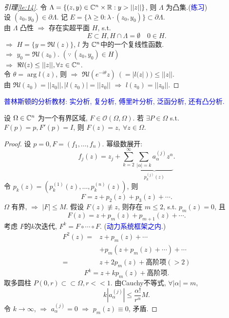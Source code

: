 \begin{proof}[引理\ref{le:14}]
  令 $\Lambda  =\{(z,y)\in {\mathbb C}^n \times {\mathbb R}: y >||z|| \}$, 则 $\Lambda  $ 为凸集.(\textcolor{blue}{练习}) \\
  设 $(z_0,y_0) \in \partial \Lambda  $. 记 $E=\{\lambda \geq 0: \lambda \cdot (z_0,y_0)\} \subset \partial \Lambda  $.\\
  由 $\Lambda  $  凸性  $\Rightarrow $ 存在实超平面 $H$, s.t. 
  $$ E \subset H, H \cap \Lambda =\emptyset  \quad 0 \in H. $$ 
  $\Rightarrow $ $H=\{y=\Re l(z)\}$, $l$  为 ${\mathbb C}^n $中的一个复线性函数.\\
  $\Rightarrow $ $y_0=\Re l(z_0)$. $(\because ~(z_0,y_0) \in H)$    \\
  $\Rightarrow $ $\Re l(z) \leq ||z||, \forall z \in {\mathbb C}^n$.\\
  令 $\theta =\arg l(z)$, 则
  $\Rightarrow $ $\Re l(e^{-i \theta }z)~(=|l(z|)) \leq ||z||$. \\
  由 $\Re l(z_0)=||z_0||, |l(z_0)|=||z_0||$     $\Rightarrow $ $l(z_0)=||z_0||.$   
\end{proof}
\begin{remark}
   \textcolor{blue}{普林斯顿的分析教材: 实分析, 复分析, 傅里叶分析, 泛函分析, 还有凸分析. }
\end{remark}

\begin{theorem}
    设 $\Omega \in {\mathbb C}^n$  为一个有界区域, $F \in \mathcal{O}(\Omega ,\Omega )$. 
    若 $\exists P \in \Omega $ s.t. $F(p)=p, F'(p)=I$,   
    则 $F(z)=z, ~ \forall z \in \Omega $. 
\end{theorem}
\begin{proof}
  设 $ p=0, F=(f_1,\dots,f_n) $.
  幂级数展开: 
  $$ f_j(z)=z_j+\sum_{k=2}^{\infty }\underbrace{\sum_{|\alpha | =k} a_{\alpha }^{(j)}z^{\alpha } }_{p_k^{(j)}(z)}.$$
令 $ p_{k}(z)=(p_k^{(1)}(z),\dots,p_k^{(n)}(z)) $, 则 
$$ F=z+p_2(z)+p_3(z)+\cdots . $$
$ \Omega  $ 有界, $ \Rightarrow  $ $ |F| \leq M $. 假设 $ F(z) \not \equiv z $, 则存在 $ m \leq 2 $, s.t. $ p_m(z)=0 $, 且 
$$ F(z)=z+p_m(z)+p_{m+1}(z)+\cdots.  $$
考虑 $ F $的$k$次迭代, $ F^k=F \circ \cdots \circ  F $. (\textcolor{blue}{动力系统框架之内.})
$$ \begin{aligned}
  F^2(z)=&z+p_m(z)+\cdots \\
  &+p_m(z+p_m(z)+\cdots)+\cdots \\
  =&z+2p_m(z)+\text{高阶项}(>2)
\end{aligned}  $$
$$
  F^k=z+kp_m(z)+\text{高阶项}.
$$
取多圆柱 $ P(0,r) \subset \subset \Omega , r <<1 $. 
由Cauchy不等式, $ \forall |\alpha| =m $, 
$$ k \left| a_{\alpha }^{(j)} \right|  \leq \frac{\alpha !}{r^{\alpha }}M .$$
令 $ k \to \infty  $, $ \Rightarrow  $ $  a_{\alpha }^{(j)}=0 $ $ \Rightarrow  $ $ p_m(z)\equiv  0 $, 矛盾.
\end{proof}

